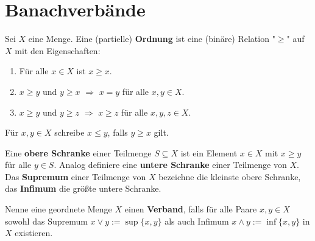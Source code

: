 \section{Banachverbände}



\begin{defi}
Sei $X$ eine Menge. Eine (partielle) \textbf{Ordnung} ist eine (binäre) Relation "$\geq$"\; auf $X$ mit den Eigenschaften:
\begin{enumerate}
\item Für alle $x\in X$ ist $x\geq x$.
\item $x\geq y$ und $y\geq x$ $\Rightarrow$ $x=y$ für alle $x,y\in X$.  
\item $x\geq y$ und $y\geq z$ $\Rightarrow$ $x\geq z$ für alle $x,y, z\in X$.
\end{enumerate}
Für $x,y\in X$ schreibe $x\leq y$, falls $y\geq x$ gilt. 
\par
Eine \textbf{obere Schranke} einer Teilmenge $S\subseteq X$ ist ein Element $x\in X$ mit $x\geq y$ für alle $y\in S$. Analog definiere eine \textbf{untere Schranke} einer Teilmenge von $X$.  
Das \textbf{Supremum} einer Teilmenge von $X$ bezeichne die kleinste obere Schranke, das \textbf{Infimum} die größte untere Schranke. 

\par
Nenne eine geordnete Menge $X$ einen \textbf{Verband}, falls für alle Paare $x,y\in X$ sowohl das Supremum $x\vee y:=\sup\{x,y\}$ als auch Infimum $x\wedge y:=\inf\{x,y\}$ in $X$ existieren.
\end{defi}

